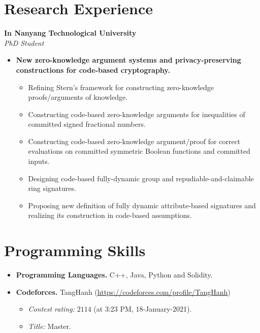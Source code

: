 \documentclass[a4paper, 11pt]{article}
\begin{document}
	\section{Research Experience}
	\textbf{In Nanyang Technological University}\\
	\textit{PhD Student}
	\begin{itemize}
		\item \textbf{New zero-knowledge argument systems and privacy-preserving constructions for code-based cryptography.}
		\begin{itemize}
			\item Refining Stern's framework for constructing zero-knowledge proofs/arguments of knowledge.
			\item Constructing code-based zero-knowledge arguments for inequalities of committed signed fractional numbers.
			\item Constructing code-based zero-knowledge argument/proof for correct evaluations on committed symmetric Boolean functions and committed inputs.
			\item Designing code-based fully-dynamic group and repudiable-and-claimable ring signatures.
			\item Proposing new definition of fully dynamic attribute-based signatures and realizing its construction in code-based assumptions.
		\end{itemize}
	\end{itemize}
	
	\section{Programming Skills}
	\begin{itemize}[noitemsep]
		\item \textbf{Programming Languages.} C++, Java, Python and Solidity.
		\item \textbf{Codeforces.} TangHanh (\url{https://codeforces.com/profile/TangHanh})
		\begin{itemize}
			\item \textit{Contest rating:} $2114$ (at 3:23 PM, 18-January-2021).
			\item \textit{Title:} Master.
		\end{itemize}
	\end{itemize}
	
\end{document}
